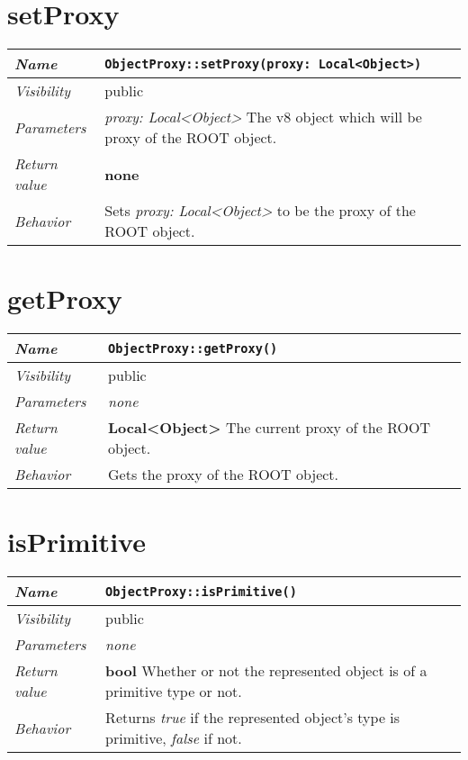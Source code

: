  \section{setProxy}
\begin{longtable}{p{3cm} @{\hskip 1cm} p{12cm}}
 \hline
\textit{Name} & \texttt{ObjectProxy::setProxy(proxy: Local<Object>)}\\
\hline
 \textit{Visibility} & public\\
\hline
\textit{Parameters} & \textit{proxy: Local<Object>} The v8 object which will be proxy of the ROOT object. \\
\hline
\textit{Return value} & \textbf{none}\\
  \hline
 \textit{Behavior} & Sets \textit{proxy: Local<Object>} to be the proxy of the ROOT object. \\
\hline
\end{longtable} \pagebreak
 \section{getProxy}
\begin{longtable}{p{3cm} @{\hskip 1cm} p{12cm}}
 \hline
\textit{Name} & \texttt{ObjectProxy::getProxy()}\\
\hline
 \textit{Visibility} & public\\
\hline
\textit{Parameters} & \textit{none}\\
\hline
\textit{Return value} & \textbf{Local<Object>} The current proxy of the ROOT object. \\
  \hline
 \textit{Behavior} & Gets the proxy of the ROOT object. \\
\hline
\end{longtable} 
 \section{isPrimitive}
\begin{longtable}{p{3cm} @{\hskip 1cm} p{12cm}}
 \hline
\textit{Name} & \texttt{ObjectProxy::isPrimitive()}\\
\hline
 \textit{Visibility} & public\\
\hline
\textit{Parameters} & \textit{none}\\
\hline
\textit{Return value} & \textbf{bool} Whether or not the represented object is of a primitive type or not.\\
  \hline
  \textit{Behavior} & Returns \textit{true} if the represented object's type is primitive, \textit{false} if not.\\
\hline
\end{longtable} \pagebreak
